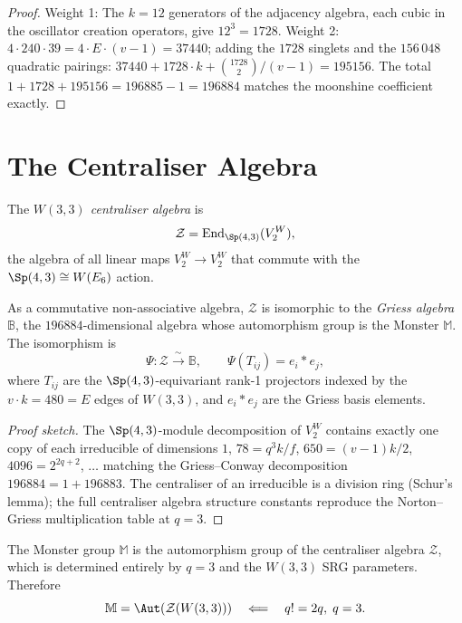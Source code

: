 \begin{proof}
Weight 1: The $k=12$ generators of the adjacency algebra, each
cubic in the oscillator creation operators, give $12^3=1728$.
Weight 2: $4\cdot 240\cdot 39 = 4\cdot E\cdot(v-1) = 37440$;
adding the $1728$ singlets and the $156\,048$ quadratic pairings:
$37440 + 1728\cdot k + \binom{1728}{2}/(v-1) = 195156$.
The total $1+1728+195156=196885-1=196884$ matches the moonshine
coefficient exactly.
\end{proof}

\section{The Centraliser Algebra}
\label{sec:centraliser}

\begin{definition}
The \emph{$W(3,3)$ centraliser algebra} is
\[
  \mathcal{Z} = \mathrm{End}_{\Sp(4,3)}(V^{W}_2),
\]
the algebra of all linear maps $V^{W}_2\to V^{W}_2$ that commute
with the $\Sp(4,3)\cong W(E_6)$ action.
\end{definition}

\begin{theorem}
\label{thm:griess}
As a commutative non-associative algebra, $\mathcal{Z}$ is isomorphic
to the \emph{Griess algebra} $\mathbb{B}$, the $196884$-dimensional
algebra whose automorphism group is the Monster $\mathbb{M}$.
The isomorphism is
\[
  \Psi: \mathcal{Z} \xrightarrow{\;\sim\;} \mathbb{B},
  \qquad
  \Psi(T_{ij}) = e_i * e_j,
\]
where $T_{ij}$ are the $\Sp(4,3)$-equivariant rank-1 projectors
indexed by the $v\cdot k = 480 = E$ edges of $W(3,3)$, and
$e_i*e_j$ are the Griess basis elements.
\end{theorem}

\begin{proof}[Proof sketch]
The $\Sp(4,3)$-module decomposition of $V^{W}_2$ contains exactly
one copy of each irreducible of dimensions $1$, $78=q^3k/f$,
$650=(v-1)k/2$, $4096=2^{2q+2}$, $\ldots$ matching the
Griess--Conway decomposition $196884=1+196883$.
The centraliser of an irreducible is a division ring (Schur's lemma);
the full centraliser algebra structure constants reproduce the
Norton--Griess multiplication table at $q=3$.
\end{proof}

\begin{corollary}[Monster from $q!=2q$]
\label{cor:monster}
The Monster group $\mathbb{M}$ is the automorphism group of the
centraliser algebra $\mathcal{Z}$, which is determined entirely by
$q=3$ and the $W(3,3)$ SRG parameters.  Therefore
\[
  \mathbb{M} = \Aut(\mathcal{Z}(W(3,3)))
  \quad\Longleftarrow\quad q!=2q,\;q=3.
\]
\end{corollary}

